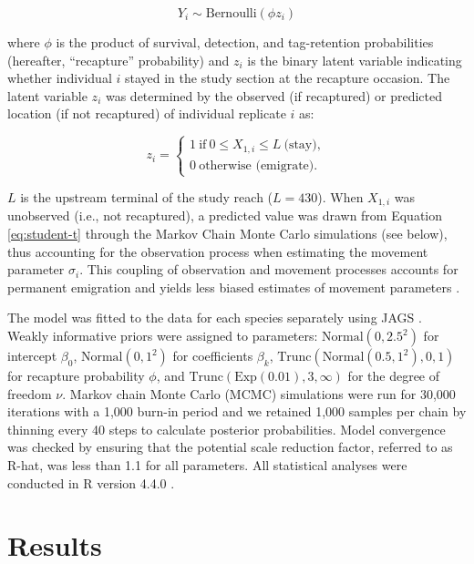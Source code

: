 \documentclass[11pt, class=article, crop=false]{standalone}
\begin{document}
\begin{equation}
    Y_i \sim \text{Bernoulli}(\phi z_i)
\end{equation}

where $\phi$ is the product of survival, detection, and tag-retention probabilities (hereafter, ``recapture'' probability) and $z_i$ is the binary latent variable indicating whether individual $i$ stayed in the study section at the recapture occasion.
The latent variable $z_i$ was determined by the observed (if recaptured) or predicted location (if not recaptured) of individual replicate $i$ as: 

\begin{equation}
    z_i =
    \begin{cases}
        1~\text{if}~0 \le X_{1,i} \le L~\text{(stay)},\\
        0~\text{otherwise (emigrate)}.
    \end{cases}
\end{equation}

$L$ is the upstream terminal of the study reach ($L = 430$). When $X_{1,i}$ was unobserved (i.e., not recaptured), a predicted value was drawn from Equation \ref{eq:student-t} through the Markov Chain Monte Carlo simulations (see below), thus accounting for the observation process when estimating the movement parameter $\sigma_i$.
This coupling of observation and movement processes accounts for permanent emigration and yields less biased estimates of movement parameters \citep{teruiModelingDispersalUsing2020}.

The model was fitted to the data for each species separately using JAGS \citep{plummerJAGSProgramAnalysis2003}. Weakly informative priors were assigned to parameters: $\text{Normal}(0, 2.5^2)$ for intercept $\beta_0$, $\text{Normal}(0, 1^2)$ for coefficients $\beta_k$, $\text{Trunc}(\text{Normal}(0.5, 1^2), 0, 1)$ for recapture probability $\phi$, and $\text{Trunc}(\text{Exp}(0.01), 3, \infty)$ for the degree of freedom $\nu$. Markov chain Monte Carlo (MCMC) simulations were run for 30,000 iterations with a 1,000 burn-in period and we retained 1,000 samples per chain by thinning every 40 steps to calculate posterior probabilities. Model convergence was checked by ensuring that the potential scale reduction factor, referred to as R-hat, was less than 1.1 for all parameters. All statistical analyses were conducted in R version 4.4.0 \citep{rcoreteamLanguageEnvironmentStatistical2021}.

\section{Results}
\end{document}
